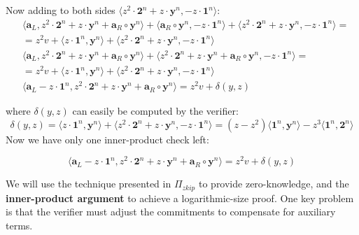 \documentclass[../../book.tex]{subfiles}
\begin{document}
Now adding to both sides $\langle z^2 \cdot \mathbf{2}^n + z \cdot \mathbf{y}^n, - z \cdot \mathbf{1}^n \rangle$:
\small
\begin{equation*}
    \begin{aligned}
        & \langle \mathbf{a}_L, z^2 \cdot \mathbf{2}^n + z \cdot \mathbf{y}^n + \mathbf{a}_R \circ \mathbf{y}^n\rangle + \langle \mathbf{a}_R \circ \mathbf{y}^n, - z \cdot \mathbf{1}^n \rangle + \boxed{\langle z^2 \cdot \mathbf{2}^n + z \cdot \mathbf{y}^n, - z \cdot \mathbf{1}^n \rangle} = \\
        & = z^2v + \langle z \cdot \mathbf{1}^n, \mathbf{y}^n \rangle + \boxed{\langle z^2 \cdot \mathbf{2}^n + z \cdot \mathbf{y}^n, - z \cdot \mathbf{1}^n \rangle} \\
        & \langle \mathbf{a}_L, z^2 \cdot \mathbf{2}^n + z \cdot \mathbf{y}^n + \mathbf{a}_R \circ \mathbf{y}^n\rangle + \boxed{\langle z^2 \cdot \mathbf{2}^n + z \cdot \mathbf{y}^n + \mathbf{a}_R \circ \mathbf{y}^n, - z \cdot \mathbf{1}^n \rangle} = \\
        & = z^2v + \boxed{\langle z \cdot \mathbf{1}^n, \mathbf{y}^n \rangle + \langle z^2 \cdot \mathbf{2}^n + z \cdot \mathbf{y}^n, - z \cdot \mathbf{1}^n \rangle} \\
        & \langle \mathbf{a}_L - z \cdot \mathbf{1}^n, z^2 \cdot \mathbf{2}^n + z \cdot \mathbf{y}^n + \mathbf{a}_R \circ \mathbf{y}^n\rangle = z^2v + \boxed{\delta(y,z)}
    \end{aligned}
\end{equation*}
\normalsize

where $\delta(y,z)$ can easily be computed by the verifier:
$$\delta(y,z) = \langle z \cdot \mathbf{1}^n, \mathbf{y}^n \rangle + \langle z^2 \cdot \mathbf{2}^n + z \cdot \mathbf{y}^n, - z \cdot \mathbf{1}^n \rangle = (z-z^2)\langle \mathbf{1}^n, \mathbf{y}^n \rangle - z^3 \langle \mathbf{1}^n, \mathbf{2}^n \rangle $$
Now we have only one inner-product check left:

\begin{equation}
    \langle \mathbf{a}_L - z \cdot \mathbf{1}^n, z^2 \cdot \mathbf{2}^n + z \cdot \mathbf{y}^n + \mathbf{a}_R \circ \mathbf{y}^n\rangle = z^2v + \delta(y,z)
    \label{eq:inner_product_check}
\end{equation}

We will use the technique presented in $\Pi_{zkip}$ to provide zero-knowledge, and the \textbf{inner-product argument} to achieve a logarithmic-size proof. One key problem is that the verifier must adjust the commitments to compensate for auxiliary terms.
\end{document}
